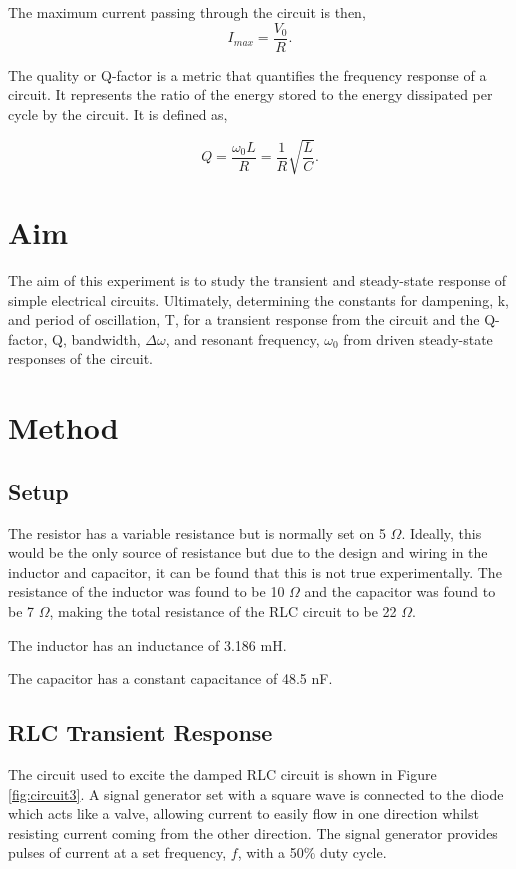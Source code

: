 \documentclass{article}
\begin{document}
The maximum current passing through the circuit is then,
\begin{equation}
    I_{max} = \frac{V_0}{R}.
\end{equation}

The quality or Q-factor is a metric that quantifies the frequency response 
of a circuit. It represents the ratio of the energy stored to the energy 
dissipated per cycle by the circuit. It is defined as,

\begin{equation}
    Q = \frac{\omega_0 L}{R} = \frac{1}{R}\sqrt{\frac{L}{C}}.
\end{equation}

\section{Aim}
The aim of this experiment is to study the transient and steady-state 
response of simple electrical circuits. Ultimately, determining the 
constants for dampening, k, and period of oscillation, T, for a transient
response from the circuit and the Q-factor, Q, bandwidth, $\Delta \omega$,
and resonant frequency, $\omega_0$ from driven steady-state responses of the 
circuit.

\section{Method}
\subsection{Setup} \label{constants}
The resistor has a variable resistance but is normally set on 5 $\Omega$.
Ideally, this would be the only source of resistance but due to the design 
and wiring in the inductor and capacitor, it can be found that this is not 
true experimentally. The resistance of the inductor was found to be 10 $\Omega$
and the capacitor was found to be 7 $\Omega$, making the total resistance of
the RLC circuit to be 22 $\Omega$.

The inductor has an inductance of 3.186 mH.

The capacitor has a constant capacitance of 48.5 nF.

\subsection{RLC Transient Response}
The circuit used to excite the damped RLC circuit is shown in Figure 
\ref{fig:circuit3}. A signal generator set with a square wave is connected
to the diode which acts like a valve, allowing current to easily flow in 
one direction whilst resisting current coming from the other direction.
The signal generator provides pulses of current at a set frequency, $f$,
with a 50$\%$ duty cycle.
\end{document}
